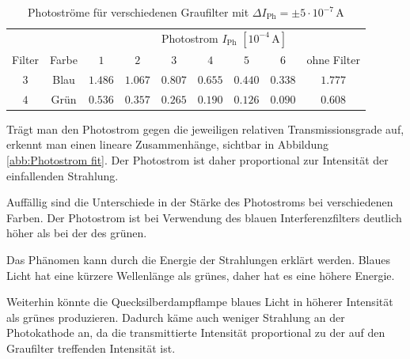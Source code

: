 \documentclass[12pt,a4paper]{scrartcl}
\numberwithin{equation}{section} %
\begin{document}
\begin{table}[h!]
	\centering
	\begin{tabular}{c|c|c|c|c|c|c|c|c}
		&& \multicolumn{7}{c}{Photostrom $I_\mathrm{Ph}$ $[10^{-4}\mathrm{\,A}]$} \\
		Filter & Farbe & $1$ & $2$ & $3$ & $4$ & $5$ & $6$ & ohne Filter\\
		\hline
		$3$ & Blau & $1.486$ & $1.067$ & $0.807$ & $0.655$ & $0.440$ & $0.338$ & $1.777$ \\
		$4$ & Grün & $0.536$ & $0.357$ & $0.265$ & $0.190$ & $0.126$ & $0.090$ & $0.608$
	\end{tabular}
	\caption{Photoströme für verschiedenen Graufilter mit $\Delta I_\mathrm{Ph} = \pm 5 \cdot 10^{-7} \mathrm{\,A}$}
	\label{tab:Photostrom Ergebnisse}
\end{table}

\noindent
Trägt man den Photostrom gegen die jeweiligen relativen Transmissionsgrade auf, erkennt man einen lineare Zusammenhänge, sichtbar in Abbildung \ref{abb:Photostrom fit}. Der Photostrom ist daher proportional zur Intensität der einfallenden Strahlung.

Auffällig sind die Unterschiede in der Stärke des Photostroms bei verschiedenen Farben. Der Photostrom ist bei Verwendung des blauen Interferenzfilters deutlich höher als bei der des grünen.

Das Phänomen kann durch die Energie der Strahlungen erklärt werden. Blaues Licht hat eine kürzere Wellenlänge als grünes, daher hat es eine höhere Energie.

Weiterhin könnte die Quecksilberdampflampe blaues Licht in höherer Intensität als grünes produzieren. Dadurch käme auch weniger Strahlung an der Photokathode an, da die transmittierte Intensität proportional zu der auf den Graufilter treffenden Intensität ist.
\end{document}
